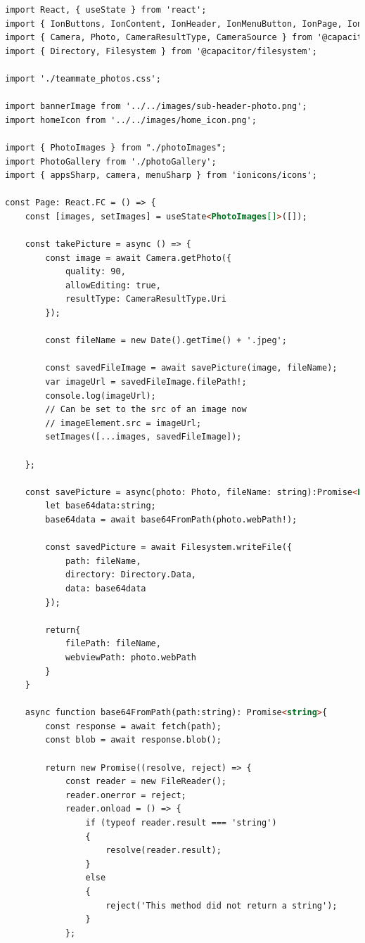 \begin{lstlisting}[language=HTML, caption=Kode dari teammate\_photos.tsx, label=kode:teammate-photos-tsx]
import React, { useState } from 'react';
import { IonButtons, IonContent, IonHeader, IonMenuButton, IonPage, IonTitle, IonToolbar, IonBackButton, IonButton, IonIcon} from '@ionic/react';
import { Camera, Photo, CameraResultType, CameraSource } from '@capacitor/camera';
import { Directory, Filesystem } from '@capacitor/filesystem';

import './teammate_photos.css';

import bannerImage from '../../images/sub-header-photo.png';
import homeIcon from '../../images/home_icon.png';

import { PhotoImages } from "./photoImages";
import PhotoGallery from './photoGallery';
import { appsSharp, camera, menuSharp } from 'ionicons/icons';

const Page: React.FC = () => {
    const [images, setImages] = useState<PhotoImages[]>([]);

    const takePicture = async () => {
        const image = await Camera.getPhoto({
            quality: 90,
            allowEditing: true,
            resultType: CameraResultType.Uri
        });
    
        const fileName = new Date().getTime() + '.jpeg';
        
        const savedFileImage = await savePicture(image, fileName);
        var imageUrl = savedFileImage.filePath!;
        console.log(imageUrl);
        // Can be set to the src of an image now
        // imageElement.src = imageUrl;
        setImages([...images, savedFileImage]);

    };

    const savePicture = async(photo: Photo, fileName: string):Promise<PhotoImages> => {
        let base64data:string;
        base64data = await base64FromPath(photo.webPath!);

        const savedPicture = await Filesystem.writeFile({
            path: fileName,
            directory: Directory.Data,
            data: base64data
        });

        return{
            filePath: fileName,
            webviewPath: photo.webPath
        }
    }

    async function base64FromPath(path:string): Promise<string>{
        const response = await fetch(path);
        const blob = await response.blob();

        return new Promise((resolve, reject) => {
            const reader = new FileReader();
            reader.onerror = reject;
            reader.onload = () => {
                if (typeof reader.result === 'string')
                {
                    resolve(reader.result);
                }
                else
                {
                    reject('This method did not return a string');
                }
            };


\end{lstlisting}
